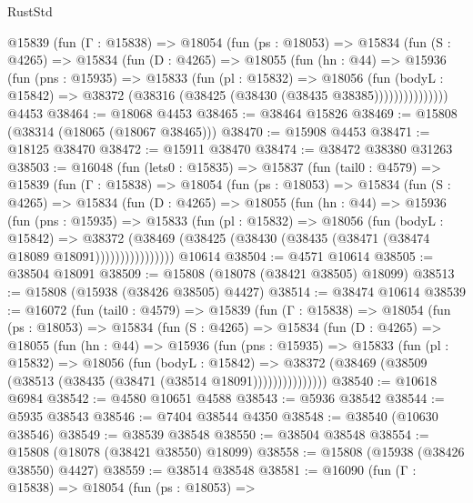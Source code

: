 \begin{lexlean}{RustStd}
\begin{coremodule}
        @15839
          (fun (Γ : @15838) =>
          @18054
            (fun (ps : @18053) =>
            @15834
              (fun (S : @4265) =>
              @15834
                (fun (D : @4265) =>
                @18055
                  (fun (hn : @44) =>
                  @15936
                    (fun (pns : @15935) =>
                    @15833
                      (fun (pl : @15832) =>
                      @18056
                        (fun (bodyL : @15842) =>
                        @38372 (@38316 (@38425 (@38430 (@38435 @38385)))))))))))))))
    @4453
@38464 := @18068 @4453
@38465 := @38464 @15826
@38469 := @15808 (@38314 (@18065 (@18067 @38465)))
@38470 := @15908 @4453
@38471 := @18125 @38470
@38472 := @15911 @38470
@38474 := @38472 @38380 @31263
@38503 := @16048
    (fun (lets0 : @15835) =>
    @15837
      (fun (tail0 : @4579) =>
      @15839
        (fun (Γ : @15838) =>
        @18054
          (fun (ps : @18053) =>
          @15834
            (fun (S : @4265) =>
            @15834
              (fun (D : @4265) =>
              @18055
                (fun (hn : @44) =>
                @15936
                  (fun (pns : @15935) =>
                  @15833
                    (fun (pl : @15832) =>
                    @18056
                      (fun (bodyL : @15842) =>
                      @38372
                        (@38469
                          (@38425 (@38430 (@38435 (@38471 (@38474 @18089 @18091))))))))))))))))
    @10614
@38504 := @4571 @10614
@38505 := @38504 @18091
@38509 := @15808 (@18078 (@38421 @38505) @18099)
@38513 := @15808 (@15938 (@38426 @38505) @4427)
@38514 := @38474 @10614
@38539 := @16072
    (fun (tail0 : @4579) =>
    @15839
      (fun (Γ : @15838) =>
      @18054
        (fun (ps : @18053) =>
        @15834
          (fun (S : @4265) =>
          @15834
            (fun (D : @4265) =>
            @18055
              (fun (hn : @44) =>
              @15936
                (fun (pns : @15935) =>
                @15833
                  (fun (pl : @15832) =>
                  @18056
                    (fun (bodyL : @15842) =>
                    @38372 (@38469 (@38509 (@38513 (@38435 (@38471 (@38514 @18091)))))))))))))))
@38540 := @10618 @6984
@38542 := @4580 @10651 @4588
@38543 := @5936 @38542
@38544 := @5935 @38543
@38546 := @7404 @38544 @4350
@38548 := @38540 (@10630 @38546)
@38549 := @38539 @38548
@38550 := @38504 @38548
@38554 := @15808 (@18078 (@38421 @38550) @18099)
@38558 := @15808 (@15938 (@38426 @38550) @4427)
@38559 := @38514 @38548
@38581 := @16090
    (fun (Γ : @15838) =>
    @18054
      (fun (ps : @18053) =>

\end{coremodule}
\end{lexlean}

